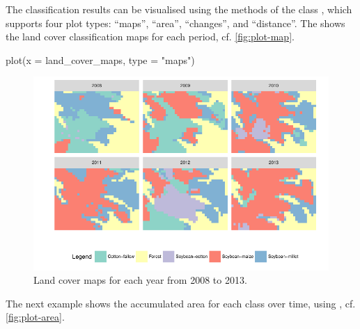 \documentclass[article,shortnames]{jss}
\begin{document}
The classification results can be visualised using the 
methods of the class , which supports four plot types:
``maps'', ``area'', ``changes'', and ``distance''. The
 shows the land cover classification maps for each
period, cf. \autoref{fig:plot-map}.

\begin{CodeChunk}
\begin{CodeInput}
plot(x = land_cover_maps, type = "maps")
\end{CodeInput}
\begin{figure}[!ht]

{\centering \includegraphics{applying_twdtw_files/figure-latex/plot-map-1} 

}

\caption[Land cover maps for each year from 2008 to 2013]{Land cover maps for each year from 2008 to 2013.}\label{fig:plot-map}
\end{figure}
\end{CodeChunk}

The next example shows the accumulated area for each class over time,
using , cf. \autoref{fig:plot-area}.
\end{document}
